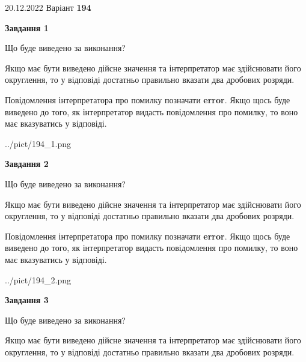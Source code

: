 \documentclass[12pt, ukrainian]{article}
\begin{document}
{20.12.2022 Варіант \No \textbf { 194 }\par}
{
\begin {Large}

{\begin {center}\textbf{Завдання 1}\end {center}}\par
Що буде виведено за виконання? \par

Якщо має бути виведено дійсне значення та інтерпретатор має здійснювати його округлення, 
то у відповіді достатньо правильно вказати два дробових розряди.

Повідомлення інтерпретатора про помилку позначати \textbf{error}.
Якщо щось буде виведено до того, як інтерпретатор видасть повідомлення про помилку, 
то воно має вказуватись у відповіді. \par

\begin{center}
	{../pict/194_1.png}
\end{center}
\newpage

{\begin {center}\textbf{Завдання 2}\end {center}}\par
Що буде виведено за виконання? \par

Якщо має бути виведено дійсне значення та інтерпретатор має здійснювати його округлення, 
то у відповіді достатньо правильно вказати два дробових розряди.

Повідомлення інтерпретатора про помилку позначати \textbf{error}.
Якщо щось буде виведено до того, як інтерпретатор видасть повідомлення про помилку, 
то воно має вказуватись у відповіді. \par

\begin{center}
	{../pict/194_2.png}
\end{center}
\newpage

{\begin {center}\textbf{Завдання 3}\end {center}}\par
Що буде виведено за виконання? \par

Якщо має бути виведено дійсне значення та інтерпретатор має здійснювати його округлення, 
то у відповіді достатньо правильно вказати два дробових розряди.


\end{Large}}
\end{document}
